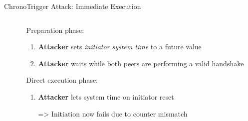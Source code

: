


\begin{frame}{ChronoTrigger Attack: Immediate Execution}
\begin{columns}[fullwidth,T]
  \begin{column}{.5\linewidth}
  \end{column}

  \begin{column}{.46\linewidth}
    \small\leavevmode
      \begin{enumblock}{Preparation phase:}
      \begin{enumerate}
        \item \textbf{Attacker} sets \emph{initiator system time} to a future value
        \item \textbf{Attacker} waits while both peers are performing a valid handshake
      \end{enumerate}
      \end{enumblock}
      \begin{enumblock}{Direct execution phase:}
      \begin{enumerate}
        \item \textbf{Attacker} lets system time on initiator reset
        \item[=>] Initiation now fails due to counter mismatch
      \end{enumerate}
      \end{enumblock}
  \end{column}
\end{columns}
\end{frame}


